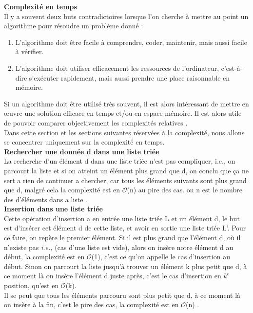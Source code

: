 \documentclass[hidelinks,a4paper,12pt]{article}
\begin{document}
\textbf {Complexité en temps} \\
Il y a souvent deux buts contradictoires lorsque l’on cherche à mettre au point un algorithme pour résoudre un problème donné :
\begin{enumerate}
	\item L’algorithme doit être facile à comprendre, coder, maintenir, mais aussi facile à vérifier. 
	\item L’algorithme doit utiliser efficacement les ressources de l’ordinateur, c’est-à-dire s’exécuter rapidement, mais aussi prendre une place raisonnable en mémoire.
\end{enumerate}
Si un algorithme doit être utilisé très souvent, il est alors intéressant de mettre en œuvre une solution efficace en temps et/ou en espace mémoire. Il est alors utile de pouvoir comparer objectivement les complexités relatives \cite{ArticleUnivSavoieRappelAlgorithmique}.\\

Dans cette section et les sections suivantes réservées à la complexité, nous allons se concentrer uniquement sur la complexité en temps.\\

\textbf {Rechercher une donnée d dans une liste triée} \\
La recherche d’un élément d dans une liste triée n’est pas compliquer, i.e., on parcourt la liste et si on atteint un élément plus grand que d, on conclu que ça ne sert a rien de continuer a chercher, car tous les éléments suivants sont plus grand que d, malgré cela la complexité est en $\mathcal{O}$(n) au pire des cas. ou n est le nombre des d’éléments dans a liste \cite{NoteCours2}. \\

\textbf {Insertion dans une liste triée} \\
Cette opération d’insertion a en entrée une liste triée L et un élément d, le but est d'insérer cet élément d de cette liste, et avoir en sortie une liste triée L'. 
Pour ce faire, on repère le premier élément. Si il est plus grand que l'élément d, où il n’existe pas \textit{i.e.,} (cas d'une liste est vide), alors on insère notre élément d au début, la complexité est en $\mathcal{O}$(1), c'est ce qu'on appelle le cas d’insertion au début. Sinon on parcourt la liste jusqu’à trouver un élément k plus petit que d, à ce moment là on insère l'élément d juste après, c'est le cas d’insertion en $k^e$ position, qu'est en $ \mathcal{O}$(k).\\
Il se peut que tous les éléments parcouru sont plus petit que d, à ce moment là on insère à la fin, c'est le pire des cas, la complexité est en $\mathcal{O}$(n) \cite{NoteCours2}. \\
\end{document}
